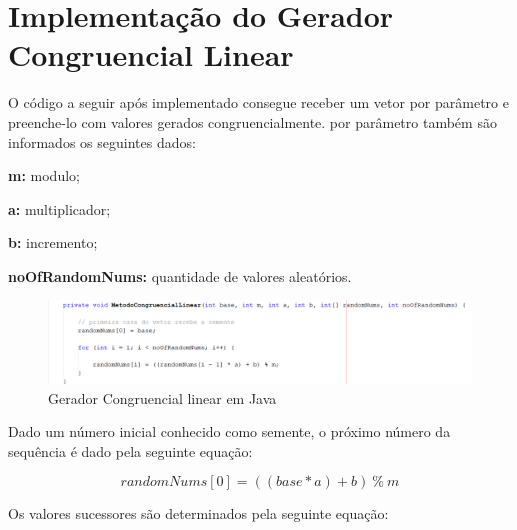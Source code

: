 

%    



\section{Implementação do Gerador Congruencial Linear}
O código a seguir após implementado consegue receber um vetor por parâmetro e preenche-lo com valores gerados congruencialmente.
por parâmetro também são informados os seguintes dados:

\textbf{m: } modulo;

\textbf{a: } multiplicador;

\textbf{b: } incremento;

\textbf{noOfRandomNums: } quantidade de valores aleatórios.

\begin{figure}[ht]
    \includegraphics[scale=0.54]{JoseGeraldo-lista2/fig/fig2.png}
    \caption{Gerador Congruencial linear em Java \cite{site1}}
\end{figure}

Dado um número inicial conhecido como semente, o próximo número da sequência é dado pela seguinte equação:

\begin{equation}
            randomNums[0] = ((base * a) + b) \ \% \ m
            \label{equ: equação congruencial linear}
\end{equation}


Os valores sucessores são determinados pela seguinte equação:

